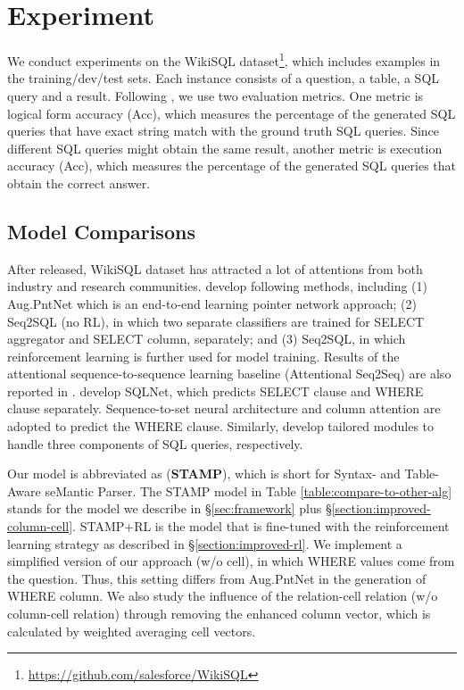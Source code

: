\documentclass[11pt,a4paper]{article}
\begin{document}
\section{Experiment}
We conduct experiments on the WikiSQL dataset\footnote{\url{https://github.com/salesforce/WikiSQL}}, which includes  examples in the training/dev/test sets.
Each instance consists of a question, a table, a SQL query and a result.
Following , we use two evaluation metrics. One metric is logical form accuracy (Acc), which measures the percentage of the generated SQL queries that have exact string match with the ground truth SQL queries.
Since different SQL queries might obtain the same result, another metric is
execution accuracy (Acc), which measures the percentage of the generated SQL queries that obtain the correct answer.

\subsection{Model Comparisons}
After released, WikiSQL dataset has attracted a lot of attentions from both industry and research communities.
 develop following methods, including (1)
{Aug.PntNet} which is an end-to-end learning pointer network approach;
	(2) {Seq2SQL (no RL)}, in which two separate classifiers are trained for SELECT aggregator and SELECT column, separately; and (3) {Seq2SQL}, in which reinforcement learning is further used for model training.
	Results of the attentional sequence-to-sequence learning baseline ({Attentional Seq2Seq}) are also reported in \cite{zhong2017seq2sql}. 
	 develop {SQLNet}, which predicts SELECT clause and WHERE clause separately. Sequence-to-set neural architecture and column attention are adopted to predict the WHERE clause.
Similarly,  develop tailored modules to handle three components of SQL queries, respectively.









Our model is abbreviated as (\textbf{STAMP}), which is short for Syntax- and Table- Aware seMantic Parser.
The STAMP model in Table \ref{table:compare-to-other-alg} stands for the model we describe in \S \ref{sec:framework} plus \S \ref{section:improved-column-cell}.
\mbox{STAMP+RL} is the model that is fine-tuned with the reinforcement learning strategy as described in \S \ref{section:improved-rl}.
We implement a simplified version of our approach (w/o cell), in which WHERE values come from the question. Thus, this setting differs from Aug.PntNet in the generation of WHERE \mbox{column}.
We also study the influence of the relation-cell relation (w/o column-cell relation) through removing the enhanced column vector, which is calculated by weighted averaging cell vectors.
\end{document}
